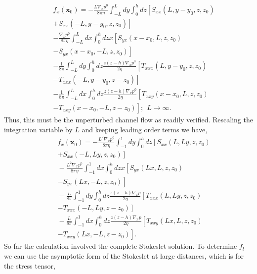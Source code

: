 \begin{eqnarray}&&
f_x(\bm x_0)=-\frac{L\nabla_x p^0}{8\pi\eta} \int_{-L}^L dy\int_0^h dz \left[S_{xx}(L, y-y_0, z, z_0)\right.\nonumber\\&&\left.+S_{xx}(-L, y-y_0, z, z_0)\right]\nonumber\\&&-\frac{\nabla_x p^0}{8\pi\eta} \int_{-L}^L dx\int_0^h dz x\left[S_{yx}(x-x_0, L, z, z_0)\right.\nonumber\\&&\left.-S_{yx}(x-x_0, -L, z, z_0)\right]\nonumber\\&&-\frac{1}{8\pi} \int_{-L}^L dy\int_0^h dz \frac{z(z-h)\nabla_x p^0}{2\eta}\left[T_{xxx}(L, y-y_0, z, z_0)\right.\nonumber\\&&\left.-T_{xxx}(-L, y-y_0, z-z_0)\right]\nonumber\\&&-\frac{1}{8\pi} \int_{-L}^L dx\int_0^h dz \frac{z(z-h)\nabla_x p^0}{2\eta}\left[T_{xxy}(x-x_0, L, z, z_0)\right.\nonumber\\&&\left.-T_{xxy}(x-x_0, -L, z-z_0)\right];\ \ L\to\infty.
\end{eqnarray}
Thus, this must be the unperturbed channel flow as readily verified. Rescaling the integration variable by $L$ and keeping leading order terms we have,
\begin{eqnarray}&&\!\!\!\!\!\!\!\!\!\!
f_x(\bm x_0)=-\frac{L^2\nabla_x p^0}{8\pi\eta} \int_{-1}^1 dy\int_0^h dz \left[S_{xx}(L, Ly, z, z_0)\right.\nonumber\\&&\!\!\!\!\!\!\!\!\!\!\left.+S_{xx}(-L, Ly, z, z_0)\right]\nonumber\\&&\!\!\!\!\!\!\!\!\!\!-\frac{L^2\nabla_x p^0}{8\pi\eta} \int_{-1}^1 dx\int_0^h dz x\left[S_{yx}(Lx, L, z, z_0)\right.\nonumber\\&&\!\!\!\!\!\!\!\!\!\!\left.-S_{yx}(Lx, -L, z, z_0)\right]\nonumber\\&&\!\!\!\!\!\!\!\!\!\!-\frac{L}{8\pi} \int_{-1}^1 dy\int_0^h dz \frac{z(z-h)\nabla_x p}{2\eta}\left[T_{xxx}(L, Ly, z, z_0)\right.\nonumber\\&&\!\!\!\!\!\!\!\!\!\!\left.-T_{xxx}(-L, Ly, z-z_0)\right]\nonumber\\&&\!\!\!\!\!\!\!\!\!\!-\frac{L}{8\pi} \int_{-1}^1 dx\int_0^h dz \frac{z(z-h)\nabla_x p}{2\eta}\left[T_{xxy}(Lx, L, z, z_0)\right.\nonumber\\&&\!\!\!\!\!\!\!\!\!\!\left.-T_{xxy}(Lx, -L, z-z_0)\right].
\end{eqnarray}
So far the calculation involved the complete Stokeslet solution. To determine $f_l$ we can use the asymptotic form of the Stokeslet at large distances, which is  for the stress tensor,

